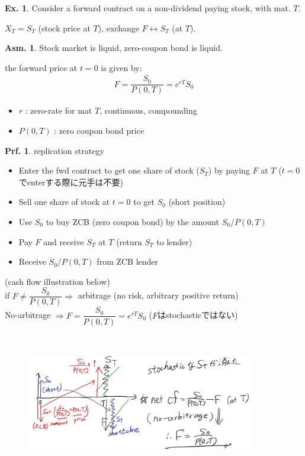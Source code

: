 \documentclass[a4paper,11pt]{jsarticle}
\theoremstyle{definition}
\newtheorem{prf}{Prf.}[subsection]
\newtheorem{ex}{Ex.}[subsection]
\newtheorem{asm}{Asm.}[subsection]
\newcommand{\df}[2]{\dfrac{#1}{#2}}
\begin{document}
\begin{ex}\label{fwd1}
  Consider a forward contract on a non-dividend paying stock,
  with mat. $T$.
  
  $X_T=S_T$ (stock price at $T$),
  exchange $F \leftrightarrow S_T$ (at $T$).
  \begin{asm}
    Stock market is liquid, zero-coupon bond is liquid.
  \end{asm}
  the forward price at $t=0$ is given by:
  \begin{align}
    F=\df{S_0}{P(0,T)}=e^{rT}S_0
  \end{align}
  \begin{itemize}
    \item $r$ : zero-rate for mat $T$, continuous, compounding
    \item $P(0,T)$ : zero coupon bond price
  \end{itemize}
  
  \begin{prf}{replication strategy}
    \begin{itemize}
      \item Enter the fwd contract to get one share of stock
      ($S_T$) by paying $F$ at $T$
      ($t=0$でenterする際に元手は不要)
      \item Sell one share of stock at $t=0$ to get $S_0$
      (short position)
      \item Use $S_0$ to buy ZCB (zero coupon bond) by the amount
      $S_0/P(0,T)$
      \item Pay $F$ and receive $S_T$ at $T$ (return $S_T$ to lender)
      \item Receive $S_0/P(0,T)$ from ZCB lender
    \end{itemize}
    (cash flow illustration below) \\
    if $F\neq \df{S_0}{P(0,T)} \Rightarrow$ arbitrage
    (no risk, arbitrary positive return) \\
    No-arbitrage $\Rightarrow F=\df{S_0}{P(0,T)}=e^{rT}S_0$
    ($F$はstochasticではない)
  \end{prf}
\end{ex}

\begin{figure}[H]　%
  \begin{center}
    \includegraphics[width=10cm]{fig/1_2_01.JPG}
  \end{center}
\end{figure}
\end{document}
